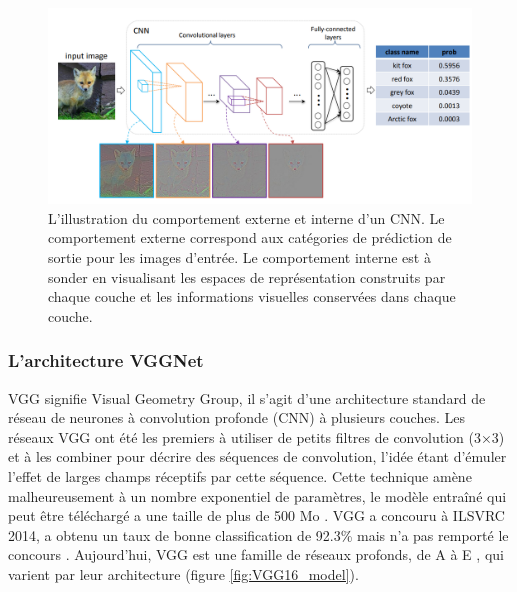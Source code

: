 	
	\begin{figure}[H]%
		\centering
		\includegraphics[width=\textwidth]{images/cnn-fox}
		\caption[L'illustration du comportement externe et interne d'un CNN.]{L'illustration du comportement externe et interne d'un CNN. Le comportement externe correspond aux catégories de prédiction de sortie pour les images d'entrée. Le comportement interne est à sonder en visualisant les espaces de représentation construits par chaque couche et les informations visuelles conservées dans chaque couche. \cite{yu2016visualizing}}
		\label{fig:cnn_exemple}
	\end{figure}
	
	
			
	\subsubsection{\textbf{L'architecture VGGNet}}\label{subsec:vggnet}
	
	VGG signifie Visual Geometry Group, il s'agit d'une architecture standard de réseau de neurones à convolution profonde (CNN) à plusieurs couches.
	Les réseaux VGG ont été les premiers à utiliser de petits filtres de convolution (3×3) et à les combiner pour décrire des séquences de convolution, l'idée étant d'émuler l'effet de larges champs réceptifs par cette séquence. Cette technique amène malheureusement à un nombre exponentiel de paramètres, le modèle entraîné qui peut être téléchargé a une taille de plus de 500 Mo  \cite{simonyan2014very}. VGG a concouru à ILSVRC 2014, a obtenu un taux de bonne classification de 92.3\% mais n'a pas remporté le concours \cite{krizhevsky2012imagenet}. Aujourd'hui, VGG est une famille de réseaux profonds, de A à E \cite{tammina2019transfer}, qui varient par leur architecture (figure \ref{fig:VGG16_model}). %
	
